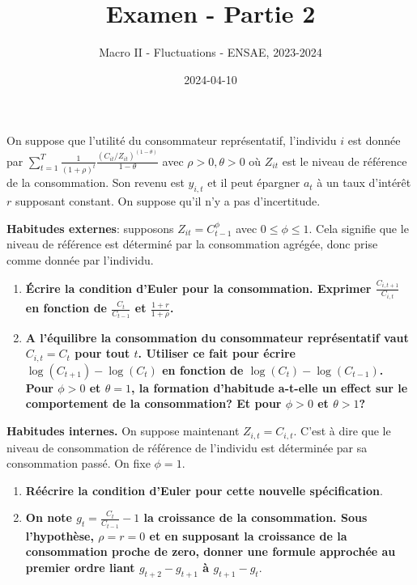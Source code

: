 \documentclass[
  letterpaper,
  DIV=11,
  numbers=noendperiod]{scrartcl}
\title{Examen - Partie 2}
\subtitle{Macro II - Fluctuations - ENSAE, 2023-2024}
\author{}
\date{2024-04-10}
\begin{document}
\maketitle

\subsection{}\label{section}

On suppose que l'utilité du consommateur représentatif, l'individu \(i\)
est donnée par
\(\sum_{t=1}^T \frac{1}{(1+\rho)^t} \frac{(C_{it}/Z_{it})^(1-\theta)}{1-\theta}\)
avec \(\rho>0, \theta>0\) où \(Z_{it}\) est le niveau de référence de la
consommation. Son revenu est \(y_{i,t}\) et il peut épargner \(a_t\) à
un taux d'intérêt \(r\) supposant constant. On suppose qu'il n'y a pas
d'incertitude.

\textbf{Habitudes externes}: supposons \(Z_{it} = C_{t-1}^{\phi}\) avec
\(0\leq \phi \leq 1\). Cela signifie que le niveau de référence est
déterminé par la consommation agrégée, donc prise comme donnée par
l'individu.

\begin{enumerate}
\def\labelenumi{\arabic{enumi}.}
\item
  \textbf{Écrire la condition d'Euler pour la consommation. Exprimer
  \(\frac{C_{i,t+1}}{C_{i,t}}\) en fonction de \(\frac{C_t}{C_{t-1}}\)
  et \(\frac{1+r}{1+\rho}\).}
\item
  \textbf{A l'équilibre la consommation du consommateur représentatif
  vaut \(C_{i,t}=C_t\) pour tout \(t\). Utiliser ce fait pour écrire
  \(\log(C_{t+1}) - \log(C_t)\) en fonction de
  \(\log(C_t)-\log(C_{t-1})\). Pour \(\phi>0\) et \(\theta=1\), la
  formation d'habitude a-t-elle un effect sur le comportement de la
  consommation? Et pour \(\phi>0\) et \(\theta>1\)?}
\end{enumerate}

\textbf{Habitudes internes.} On suppose maintenant \(Z_{i,t}=C_{i,t}\).
C'est à dire que le niveau de consommation de référence de l'individu
est déterminée par sa consommation passé. On fixe \(\phi=1\).

\begin{enumerate}
\def\labelenumi{\arabic{enumi}.}
\setcounter{enumi}{2}
\item
  \textbf{Réécrire la condition d'Euler pour cette nouvelle
  spécification}.
\item
  \textbf{On note \(g_t=\frac{C_t}{C_{t-1}}-1\) la croissance de la
  consommation. Sous l'hypothèse, \(\rho=r=0\) et en supposant la
  croissance de la consommation proche de zero, donner une formule
  approchée au premier ordre liant \(g_{t+2}-g_{t+1}\) à
  \(g_{t+1}-g_t\)}.
\end{enumerate}
\end{document}
